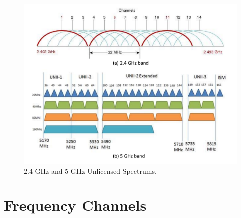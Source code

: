 \begin{figure}[!t]
	\centering
	\includegraphics[width=1.0\columnwidth]{figures2/2-5GHz-spectrum.pdf}
	\caption{$2.4$ GHz and $5$ GHz Unlicensed Spectrums.}
	\label{figs:2-5GHz-spectrum}
\end{figure}


\section{Frequency Channels}

